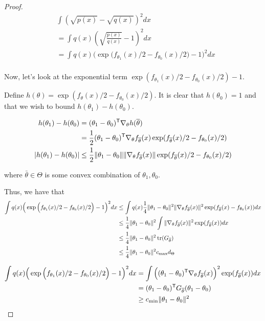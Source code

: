 \begin{proof}


\begin{align*}
& \int (\sqrt{p(x)} - \sqrt{q(x)})^2 dx \\
& = \int q(x) \left(
        \sqrt{ \frac{p(x)}{q(x)} } - 1 \right)^2 dx \\
&= \int q(x)
       \Big( \exp\Big( f_{\theta_1}(x)/2 - f_{\theta_0}(x)/2 \Big) - 1 \Big)^2 dx \\
\end{align*}

Now, let's look at the exponential term $\exp( f_{\theta_1}(x)/2 - f_{\theta_0}(x)/2 ) - 1$. 

Define $h(\theta) = \exp(f_{\theta}(x)/2 - f_{\theta_0}(x)/2 )$. It is clear that $h(\theta_0) = 1$ and that we wish to bound $h(\theta_1) - h(\theta_0)$. 

\begin{align*}
h(\theta_1) - h(\theta_0) &= (\theta_1 - \theta_0)^{\mathsf{T}} \nabla_{\theta} h(\overline{\theta}) \\
   &= \frac{1}{2} (\theta_1 - \theta_0)^{\mathsf{T}} \nabla_{\theta} f_{\overline{\theta}}(x) 
             \exp( f_{\overline{\theta}}(x)/2 - f_{\theta_0}(x)/2 )  \\
| h(\theta_1) - h(\theta_0) | &\leq \frac{1}{2} \| \theta_1 - \theta_0 \| 
                  \| \nabla_{\theta} f_{\overline{\theta}}(x) \| \exp( f_{\overline{\theta}}(x)/2 - f_{\theta_0}(x)/2 ) 
\end{align*}

where $\bar{\theta} \in \Theta$ is some convex combination of $\theta_1, \theta_0$.



Thus, we have that
\begin{align*}
\int q(x)
       \Big( \exp\Big( f_{\theta_1}(x)/2 - f_{\theta_0}(x)/2 \Big) - 1 \Big)^2 dx 
  &\leq 
  \int q(x) \frac{1}{4} \| \theta_1 - \theta_0 \|^2 \| \nabla_{\theta} f_{\overline{\theta}}(x) \|^2 
               \exp( f_{\overline{\theta}}(x) - f_{\theta_0}(x)) dx \\
  &\leq \frac{1}{4} \| \theta_1 - \theta_0 \|^2 \int  \| \nabla_{\theta} f_{\overline{\theta}}(x) \|^2  
            \exp( f_{\overline{\theta}} (x)) d x \\
  &\leq \frac{1}{4}  \| \theta_1 - \theta_0 \|^2 \mathop{\text{tr}}( G_{\overline{\theta}} ) \\
  &\leq \frac{1}{4}  \| \theta_1 - \theta_0 \|^2 c_{\max} d_{\Theta}
\end{align*}





\begin{align*}
\int q(x)
       \Big( \exp\Big( f_{\theta_1}(x)/2 - f_{\theta_0}(x)/2 \Big) - 1 \Big)^2 dx 
   &= \int \Big( (\theta_1 - \theta_0)^{\mathsf{T}} \nabla_{\theta} f_{\overline{\theta}}(x) \Big)^2 
               \exp(f_{\overline{\theta}}(x))  dx \\
   &= (\theta_1 - \theta_0)^{\mathsf{T}} G_{\overline{\theta}} (\theta_1 - \theta_0)  \\
   &\geq c_{\min} \| \theta_1 - \theta_0 \|^2
\end{align*}



\end{proof}





